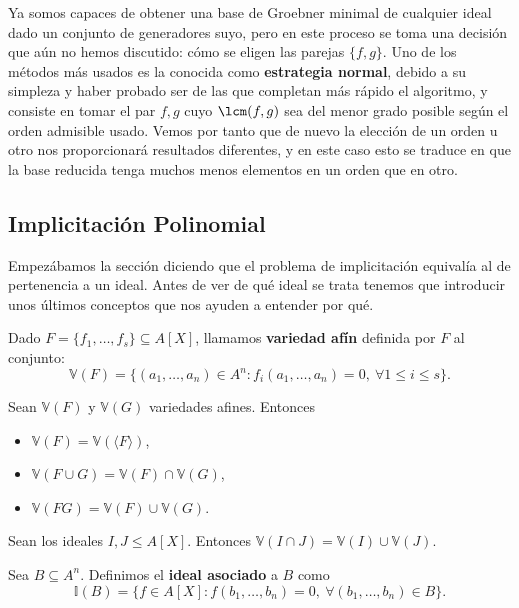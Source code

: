Ya somos capaces de obtener una base de Groebner minimal de cualquier ideal dado un conjunto de generadores suyo, pero en este proceso se toma una decisión que aún no hemos discutido: cómo se eligen las parejas $\{f,g\}$. Uno de los métodos más usados es la conocida como \textbf{estrategia normal}, debido a su simpleza y haber probado ser de las que completan más rápido el algoritmo, y consiste en tomar el par $f,g$ cuyo $\lcm(f,g)$ sea del menor grado posible según el orden admisible usado. Vemos por tanto que de nuevo la elección de un orden u otro nos proporcionará resultados diferentes, y en este caso esto se traduce en que la base reducida tenga muchos menos elementos en un orden que en otro.

\subsection{Implicitación Polinomial}
Empezábamos la sección diciendo que el problema de implicitación equivalía al de pertenencia a un ideal. Antes de ver de qué ideal se trata tenemos que introducir unos últimos conceptos que nos ayuden a entender por qué.

\begin{definicion}Dado $F=\{f_1,\dots, f_s\} \subseteq A[X]$, llamamos \textbf{variedad afín} definida por $F$ al conjunto:
    \begin{equation*}
        \mathbb{V}(F) = \{(a_1,\dots, a_n)\in A^n : f_i(a_1,\dots, a_n)=0,\ \forall 1\le i \le s\}.
    \end{equation*}
\end{definicion}

\begin{proposicion}
    Sean $\mathbb{V}(F)$ y $\mathbb{V}(G)$ variedades afines. Entonces
    \begin{itemize}
        \item  $\mathbb{V}(F) =  \mathbb{V}(\langle F\rangle)$,
        \item $\mathbb{V}(F\cup G) = \mathbb{V}(F) \cap \mathbb{V}(G)$,
        \item $\mathbb{V}(FG) = \mathbb{V}(F) \cup \mathbb{V}(G)$.
    \end{itemize}
\end{proposicion}

\begin{proposicion}
    Sean los ideales $I,J\le A[X]$. Entonces  $\mathbb{V}(I \cap J) = \mathbb{V}(I) \cup \mathbb{V}(J)$.
\end{proposicion}
\begin{definicion}
    Sea $B\subseteq A^n$. Definimos el \textbf{ideal asociado} a $B$ como
    \begin{equation*}
        \mathbb{I}(B) = \{f\in A[X] : f(b_1,\dots, b_n) = 0,\ \forall (b_1,\dots, b_n)\in B\}.
    \end{equation*}
\end{definicion}


